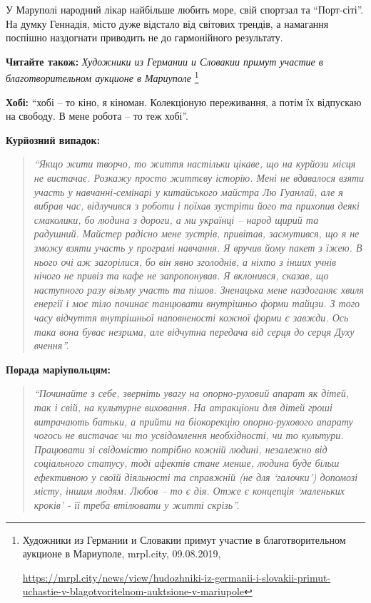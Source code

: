 У Маруполі народний лікар найбільше любить море, свій спортзал та \enquote{Порт-сіті}.
На думку Геннадія, місто дуже відстало від світових трендів, а намагання
поспішно наздогнати приводить не до гармонійного результату.

\textbf{Читайте також:} \emph{Художники из Германии и Словакии примут участие в благотворительном аукционе в Мариуполе}%
\footnote{Художники из Германии и Словакии примут участие в благотворительном аукционе в Мариуполе, mrpl.city, 09.08.2019, \par%
\url{https://mrpl.city/news/view/hudozhniki-iz-germanii-i-slovakii-primut-uchastie-v-blagotvoritelnom-auktsione-v-mariupole}
}


\textbf{Хобі:} \enquote{хобі – то кіно, я кіноман. Колекціоную переживання, а потім їх відпускаю
на свободу. В мене робота – то теж хобі}.

\textbf{Курйозний випадок:} 

\begin{quote}
\em\enquote{Якщо жити творчо, то життя настільки цікаве, що на курйози місця не вистачає.
Розкажу просто життєву історію. Мені не вдавалося взяти участь у
навчанні-семінарі у китайського майстра Лю Гуанлай, але я вибрав час,
відлучився з роботи і поїхав зустріти його та прихопив деякі смаколики, бо
людина з дороги, а ми українці – народ щирий та радушний. Майстер радісно мене
зустрів, привітав, засмутився, що я не зможу взяти участь у програмі навчання.
Я вручив йому пакет з їжею. В нього очі аж загорілися, бо він явно зголоднів, а
ніхто з інших учнів нічого не привіз та кафе не запропонував. Я вклонився,
сказав, що наступного разу візьму участь та пішов. Зненацька мене наздоганяє
хвиля енергії і моє тіло починає танцювати внутрішньо форми тайцзи. З того часу
відчуття внутрішньої наповненості кожної форми є завжди. Ось така вона буває
незрима, але відчутна передача від серця до серця Духу вчення}.
\end{quote}

\textbf{Порада маріупольцям:} 

\begin{quote}
\em\enquote{Починайте з себе, зверніть увагу на опорно-руховий апарат
як дітей, так і свій, на культурне виховання. На атракціони для дітей гроші
витрачають батьки, а прийти на біокорекцію опорно-рухового апарату чогось не
вистачає чи то усвідомлення необхідності, чи то культури. Працювати зі
свідомістю потрібно кожній людині, незалежно від соціального статусу, тоді
афектів стане менше, людина буде більш ефективною у своїй діяльності та
справжній (не для \enquote{галочки}) допомозі місту, іншим людям. Любов – то є дія.
Отже є концепція \enquote{маленьких кроків} - її треба втілювати у житті скрізь}.
\end{quote}
